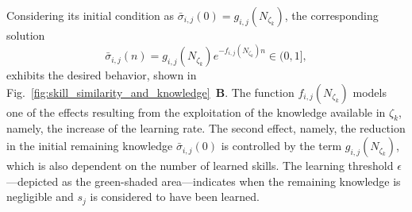 \documentclass[12pt]{article}
\begin{document}
\noindent Considering its initial condition as $\bar{\sigma}_{i,j}(0) =  g_{i,j} \left(N_{\zeta_k}\right)$, the corresponding solution
\begin{equation}\label{eq:knowledge_exponential_form}
	\bar{\sigma}_{i,j}(n) = g_{i,j}(N_{\zeta_k}) e ^{-f_{i,j}\left(N_{\zeta_k}\right) n} \in (0,1],
\end{equation}
exhibits the desired behavior, shown in Fig.~\ref{fig:skill_similarity_and_knowledge}~\textbf{B}. The function $f_{i,j}\left(N_{\zeta_k}\right)$ models one of the effects resulting from the exploitation of the knowledge available in $\zeta_k$, namely, the increase of the learning rate. The second effect, namely, the reduction in the initial remaining knowledge $\bar{\sigma}_{i,j}(0)$ is controlled by the term $g_{i,j}\left(N_{\zeta_k}\right)$, which is also dependent on the number of learned skills. The learning threshold $\epsilon$---depicted as the green-shaded area---indicates when the remaining knowledge is negligible and $s_{j}$ is considered to have been learned.
\end{document}

